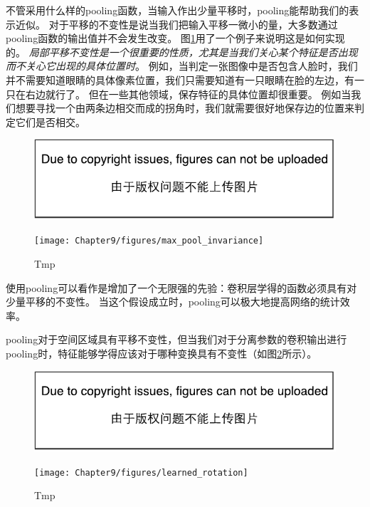 不管采用什么样的\gls{pooling}函数，当输入作出少量平移时，\gls{pooling}能帮助我们的表示近似。
对于平移的不变性是说当我们把输入平移一微小的量，大多数通过\gls{pooling}函数的输出值并不会发生改变。
图\ref{fig:chap9_max_pool_invariance}用了一个例子来说明这是如何实现的。
\emph{局部平移不变性是一个很重要的性质，尤其是当我们关心某个特征是否出现而不关心它出现的具体位置时}。
例如，当判定一张图像中是否包含人脸时，我们并不需要知道眼睛的具体像素位置，我们只需要知道有一只眼睛在脸的左边，有一只在右边就行了。
但在一些其他领域，保存特征的具体位置却很重要。
例如当我们想要寻找一个由两条边相交而成的拐角时，我们就需要很好地保存边的位置来判定它们是否相交。
\begin{figure}[!htb]
\ifOpenSource
\centerline{\includegraphics{figure.pdf}}
\else
\centerline{\texttt{[image: Chapter9/figures/max\_pool\_invariance]}}
\fi
\caption{Tmp}
\label{fig:chap9_max_pool_invariance}
\end{figure}

 
使用\gls{pooling}可以看作是增加了一个无限强的先验：卷积层学得的函数必须具有对少量平移的不变性。
当这个假设成立时，\gls{pooling}可以极大地提高网络的统计效率。

\gls{pooling}对于空间区域具有平移不变性，但当我们对于分离参数的卷积输出进行\gls{pooling}时，特征能够学得应该对于哪种变换具有不变性（如图\ref{fig:chap9_learned_rotation}所示）。
\begin{figure}[!htb]
\ifOpenSource
\centerline{\includegraphics{figure.pdf}}
\else
\centerline{\texttt{[image: Chapter9/figures/learned\_rotation]}}
\fi
\caption{Tmp}
\label{fig:chap9_learned_rotation}
\end{figure}

 
